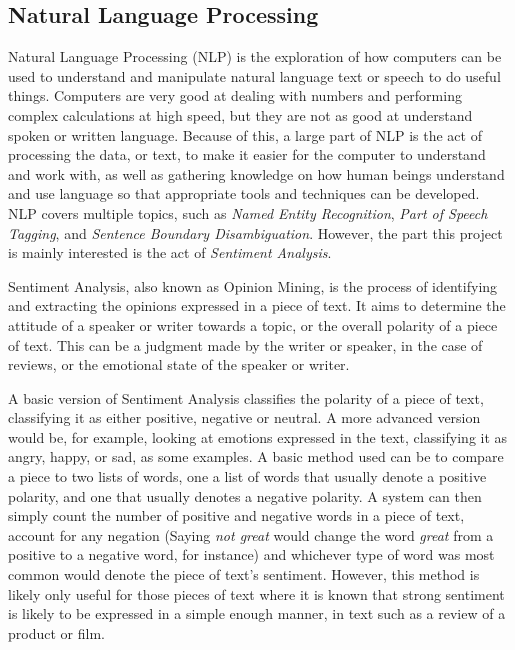 \subsection{Natural Language Processing}
\label{sec:bck_NLP}
Natural Language Processing (NLP) is the exploration of how computers can be used to understand and manipulate natural language text or speech to do useful things\cite{chowdhury2003natural}. Computers are very good at dealing with numbers and performing complex calculations at high speed, but they are not as good at understand spoken or written language. Because of this, a large part of NLP is the act of processing the data, or text, to make it easier for the computer to understand and work with, as well as gathering knowledge on how human beings understand and use language so that appropriate tools and techniques can be developed\cite{chowdhury2003natural}. NLP covers multiple topics, such as \emph{Named Entity Recognition}, \emph{Part of Speech Tagging}, and \emph{Sentence Boundary Disambiguation}. However, the part this project is mainly interested is the act of \emph{Sentiment Analysis}.

Sentiment Analysis, also known as Opinion Mining, is the process of identifying and extracting the opinions expressed in a piece of text\cite{Liu2010}. It aims to determine the attitude of a speaker or writer towards a topic, or the overall polarity of a piece of text. This can be a judgment made by the writer or speaker, in the case of reviews, or the emotional state of the speaker or writer.

A basic version of Sentiment Analysis classifies the polarity of a piece of text, classifying it as either positive, negative or neutral. A more advanced version would be, for example, looking at emotions expressed in the text, classifying it as angry, happy, or sad, as some examples. A basic method used can be to compare a piece to two lists of words, one a list of words that usually denote a positive polarity, and one that usually denotes a negative polarity. A system can then simply count the number of positive and negative words in a piece of text, account for any negation (Saying \emph{not great} would change the word \emph{great} from a positive to a negative word, for instance) and whichever type of word was most common would denote the piece of text’s sentiment. However, this method is likely only useful for those pieces of text where it is known that strong sentiment is likely to be expressed in a simple enough manner, in text such as a review of a product or film.

